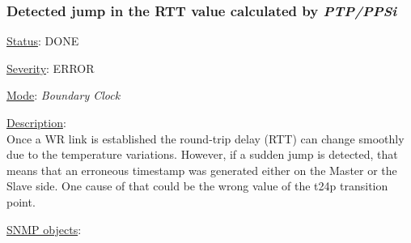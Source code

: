 \subsubsection{\bf Detected jump in the RTT value calculated by \emph{PTP/PPSi}}
		\label{fail:timing:rtt_jump}
		\begin{pck_descr}
			\item [] \underline{Status}: DONE
			\item [] \underline{Severity}: ERROR
			\item [] \underline{Mode}: \emph{Boundary Clock}
			\item [] \underline{Description}:\\
				Once a WR link is established the round-trip delay (RTT) can change
        smoothly due to the temperature variations. However, if a sudden jump is
        detected, that means that an erroneous timestamp was generated either on
        the Master or the Slave side.
				One cause of that could be the wrong value of the t24p transition point.
			\item [] \underline{SNMP objects}:\\
        {\footnotesize
				\\
				\\
				\\
				 \\
         }
		\end{pck_descr}

